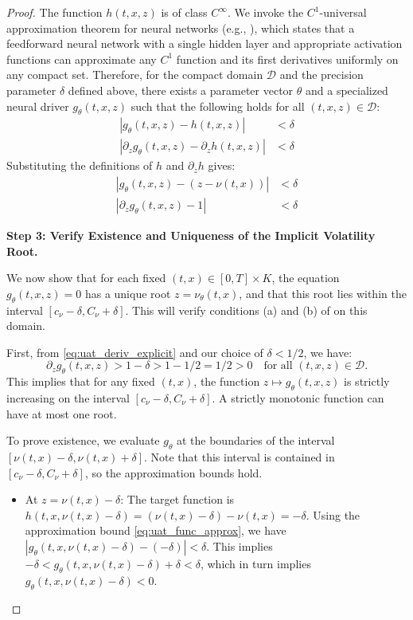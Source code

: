 \documentclass[qian]{imsart}
\newcommand{\abs}[1]{\left\lvert#1\right\rvert}
\theoremstyle{plain}
\theoremstyle{definition}
\begin{document}
\begin{proof}
The function $h(t,x,z)$ is of class $C^\infty$. We invoke the $C^1$-universal approximation theorem for neural networks (e.g., \cite{HornikStinchcombeWhite1990}), which states that a feedforward neural network with a single hidden layer and appropriate activation functions can approximate any $C^1$ function and its first derivatives uniformly on any compact set.
Therefore, for the compact domain $\mathcal{D}$ and the precision parameter $\delta$ defined above, there exists a parameter vector $\theta$ and a specialized neural driver $g_\theta(t,x,z)$ such that the following holds for all $(t,x,z) \in \mathcal{D}$:
\begin{align}
\abs{g_\theta(t,x,z) - h(t,x,z)} &< \delta \label{eq:uat_func_approx} \\
\abs{\partial_z g_\theta(t,x,z) - \partial_z h(t,x,z)} &< \delta \label{eq:uat_deriv_approx}
\end{align}
Substituting the definitions of $h$ and $\partial_z h$ gives:
\begin{align}
\abs{g_\theta(t,x,z) - (z - \nu(t,x))} &< \delta \label{eq:uat_func_explicit} \\
\abs{\partial_z g_\theta(t,x,z) - 1} &< \delta \label{eq:uat_deriv_explicit}
\end{align}

\textbf{Step 3: Verify Existence and Uniqueness of the Implicit Volatility Root.}

We now show that for each fixed $(t,x) \in [0,T] \times K$, the equation $g_\theta(t,x,z)=0$ has a unique root $z = \nu_\theta(t,x)$, and that this root lies within the interval $[c_\nu - \delta, C_\nu + \delta]$. This will verify conditions (a) and (b) of  on this domain.

First, from \eqref{eq:uat_deriv_explicit} and our choice of $\delta < 1/2$, we have:
\[
\partial_z g_\theta(t,x,z) > 1 - \delta > 1 - 1/2 = 1/2 > 0 \quad \text{for all } (t,x,z) \in \mathcal{D}.
\]
This implies that for any fixed $(t,x)$, the function $z \mapsto g_\theta(t,x,z)$ is strictly increasing on the interval $[c_\nu - \delta, C_\nu + \delta]$. A strictly monotonic function can have at most one root.

To prove existence, we evaluate $g_\theta$ at the boundaries of the interval $[\nu(t,x) - \delta, \nu(t,x) + \delta]$. Note that this interval is contained in $[c_\nu - \delta, C_\nu + \delta]$, so the approximation bounds hold.
\begin{itemize}
    \item At $z = \nu(t,x) - \delta$:
    The target function is $h(t,x, \nu(t,x) - \delta) = (\nu(t,x)-\delta) - \nu(t,x) = -\delta$.
    Using the approximation bound \eqref{eq:uat_func_approx}, we have $\abs{g_\theta(t,x, \nu(t,x)-\delta) - (-\delta)} < \delta$. This implies $-\delta < g_\theta(t,x, \nu(t,x)-\delta) + \delta < \delta$, which in turn implies $g_\theta(t,x, \nu(t,x)-\delta) < 0$.


\end{itemize}
\end{proof}
\end{document}
